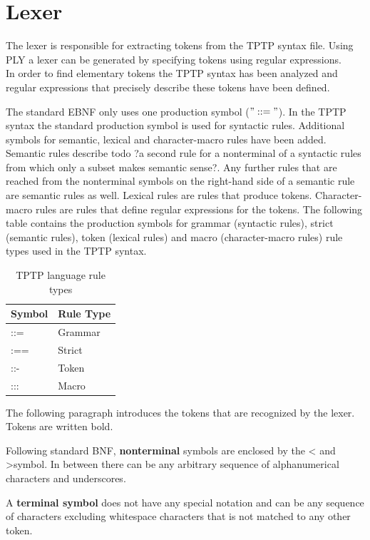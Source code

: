 \section{Lexer}\label{sec:ConceptLexer}
The lexer is responsible for extracting tokens from the \ac{TPTP} syntax file. Using \ac{PLY} a lexer can be generated by specifying tokens using regular expressions.\\
In order to find elementary tokens the \ac{TPTP} syntax has been analyzed and regular expressions that precisely describe these tokens have been defined.

The standard \ac{EBNF} only uses one production symbol ($"::="$).
In the \ac{TPTP} syntax the standard production symbol is used for syntactic rules.
Additional symbols for semantic, lexical and character-macro rules have been added. Semantic rules describe todo ?a second rule for a nonterminal of a syntactic rules from which only a subset makes semantic sense?. Any further rules that are reached from the nonterminal symbols on the right-hand side of a semantic rule are semantic rules as well. Lexical rules are rules that produce tokens. Character-macro rules are rules that define regular expressions for the tokens.
The following table contains the production symbols for grammar (syntactic rules), strict (semantic rules), token (lexical rules) and macro (character-macro rules) rule types used in the \ac{TPTP} syntax.

\begin{table}[H]
\centering
\renewcommand{\arraystretch}{1}
\caption{\ac{TPTP} language rule types \cite{VS06}}
\begin{tabular}{ll}
\textbf{Symbol} & \textbf{Rule Type}\\\hline
::= & Grammar\\
:== & Strict\\
::- & Token\\
::: & Macro\\
\end{tabular}
\label{tbl:ConceptTPTPProductionSymbols}
\end{table}

The following paragraph introduces the tokens that are recognized by the lexer. Tokens are written bold.

Following standard \ac{BNF}, \textbf{nonterminal} symbols are enclosed by the \textless\; and \textgreater \;symbol.
In between there can be any arbitrary sequence of alphanumerical characters and underscores.

A \textbf{terminal symbol} does not have any special notation and can be any sequence of characters excluding whitespace characters that is not matched to any other token.

